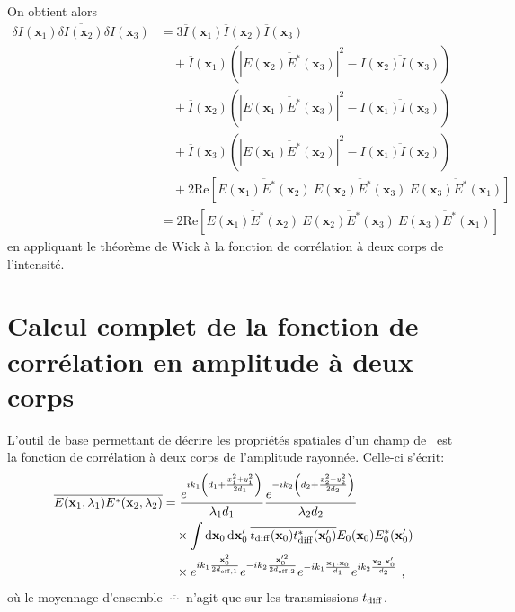 On obtient alors 
\begin{align}
\overline{\delta I(\mathbf{x}_1) \delta I(\mathbf{x}_2) \delta I(\mathbf{x}_3)} &= 3 \overline{I}(\mathbf{x}_1) \overline{I}(\mathbf{x}_2) \overline{I}(\mathbf{x}_3)\\
\nonumber & \quad + \overline{I}(\mathbf{x}_1) \left( \left|\overline{E(\mathbf{x}_2)E^*(\mathbf{x}_3)} \right|^2 -\overline{I(\mathbf{x}_2)I(\mathbf{x}_3)}\right) \\
\nonumber & \quad + \overline{I}(\mathbf{x}_2) \left( \left|\overline{E(\mathbf{x}_1)E^*(\mathbf{x}_3)}\right|^2 - \overline{I(\mathbf{x}_1)I(\mathbf{x}_3)}\right)\\
\nonumber & \quad + \overline{I}(\mathbf{x}_3) \left(\left|\overline{E(\mathbf{x}_1)E^*(\mathbf{x}_2)}\right|^2 -\overline{I(\mathbf{x}_1)I(\mathbf{x}_2)}\right)\\
\nonumber & \quad + 2\mathrm{Re}\left[ \overline{E(\mathbf{x}_1)E^*(\mathbf{x}_2)} \: \overline{E(\mathbf{x}_2)E^*(\mathbf{x}_3)} \: \overline{E(\mathbf{x}_3)E^*(\mathbf{x}_1)}\right] \\
&= 2\mathrm{Re}\left[ \overline{E(\mathbf{x}_1)E^*(\mathbf{x}_2)} \: \overline{E(\mathbf{x}_2)E^*(\mathbf{x}_3)} \: \overline{E(\mathbf{x}_3)E^*(\mathbf{x}_1)}\right]
\label{eq:wick_3corps}
\end{align}
en appliquant le théorème de Wick à la fonction de corrélation à deux corps de l'intensité.





\section{Calcul complet de la fonction de corrélation en amplitude à deux corps}
L'outil de base permettant de décrire les propriétés spatiales d'un champ de \speckle\ est la fonction de corrélation à deux corps de l'amplitude rayonnée. Celle-ci s'écrit:
\begin{align}
\overline{E(\mathbf{x}_1,\lambda_1)E^*(\mathbf{x}_2,\lambda_2)} &= \frac{e^{ik_1 \left( d_1+\frac{x_1^2+y_1^2}{2d_1} \right)}}{\lambda_1 d_1} \frac{e^{-i k_2 \left( d_2+ \frac{x_2^2+y_2^2}{2d_2} \right)}}{\lambda_2 d_2} \\
\nonumber & \quad \times \int{\mathop{}\mathopen{}\mathrm{d}\mathbf{x}_0\mathop{}\mathopen{}\mathrm{d}\mathbf{x}_0' \: \overline{t_{\mathrm{diff}}(\mathbf{x}_0)t_{\mathrm{diff}}^*(\mathbf{x}_0')} E_0(\mathbf{x}_0) E_0^*(\mathbf{x}_0')} \\
&\nonumber \quad \times e^{ik_1\frac{ \mathbf{x}_0^2}{2d_{\mathrm{eff,1}}}} e^{-ik_2\frac{ \mathbf{x}_0'^2}{2d_{\mathrm{eff,2}}}} e^{-ik_1 \frac{\mathbf{x}_1 . \mathbf{x}_0}{d_1}} e^{ik_2 \frac{\mathbf{x}_2 . \mathbf{x}_0'}{d_2}} \text{ ,}
\end{align}
où le moyennage d'ensemble $\overline{\:\cdots\:}$ n'agit que sur les transmissions $t_{\mathrm{diff}}$.

